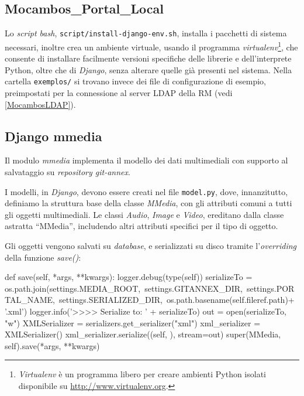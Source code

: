 \subsection{Mocambos\_Portal\_Local}

Lo \emph{script bash}, \verb|script/install-django-env.sh|, installa i
pacchetti di sistema necessari, inoltre crea un ambiente virtuale,
usando il programma \emph{virtualenv}\footnote{\emph{Virtualenv} è un
  programma libero per creare ambienti Python isolati disponibile su
  \url{http://www.virtualenv.org}.}, che consente di installare
facilmente versioni specifiche delle librerie e dell'interprete
Python, oltre che di \emph{Django}, senza alterare quelle già presenti
nel sistema. Nella cartella \verb|exemplos/| si trovano invece dei
file di configurazione di esempio, preimpostati per la connessione al
server LDAP della RM (vedi \ref{MocambosLDAP}).


\subsection{Django mmedia}

Il modulo \emph{mmedia} implementa il modello dei dati
multimediali con supporto al salvataggio su \emph{repository
  git-annex}.

I modelli, in \emph{Django}, devono essere creati nel file \verb|model.py|,
dove, innanzitutto, definiamo la struttura base della classe
\emph{MMedia}, con gli attributi comuni a tutti gli oggetti
multimediali. Le classi \emph{Audio}, \emph{Image} e \emph{Video},
ereditano dalla classe astratta ``MMedia'', includendo altri attributi
specifici per il tipo di oggetto.

Gli oggetti vengono salvati su \emph{database}, e serializzati su
disco tramite l'\emph{overriding} della funzione \emph{save()}:

\begin{code}
    def save(self, *args, **kwargs):
        logger.debug(type(self))
        serializeTo = os.path.join(settings.MEDIA_ROOT,\
                                   settings.GITANNEX_DIR,\
                                   settings.PORTAL_NAME,\
                                   settings.SERIALIZED_DIR,\
                                   os.path.basename(self.fileref.path)+ '.xml')
        logger.info('>>>> Serialize to: ' + serializeTo)
        out = open(serializeTo, "w")
        XMLSerializer = serializers.get_serializer("xml")
        xml_serializer = XMLSerializer()
        xml_serializer.serialize((self, ), stream=out)
        super(MMedia, self).save(*args, **kwargs)
\end{code}

